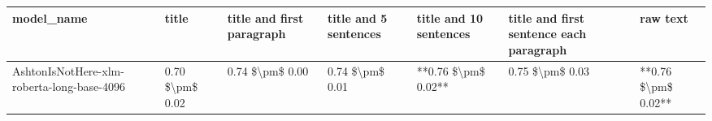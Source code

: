 \begin{tabular}{lllllll}
\toprule
                                model\_name &           title & title and first paragraph & title and 5 sentences & title and 10 sentences & title and first sentence each paragraph &            raw text \\
\midrule
AshtonIsNotHere-xlm-roberta-long-base-4096 & 0.70 \$\textbackslash pm\$ 0.02 &           0.74 \$\textbackslash pm\$ 0.00 &       0.74 \$\textbackslash pm\$ 0.01 &    **0.76 \$\textbackslash pm\$ 0.02** &                         0.75 \$\textbackslash pm\$ 0.03 & **0.76 \$\textbackslash pm\$ 0.02** \\
\bottomrule
\end{tabular}
